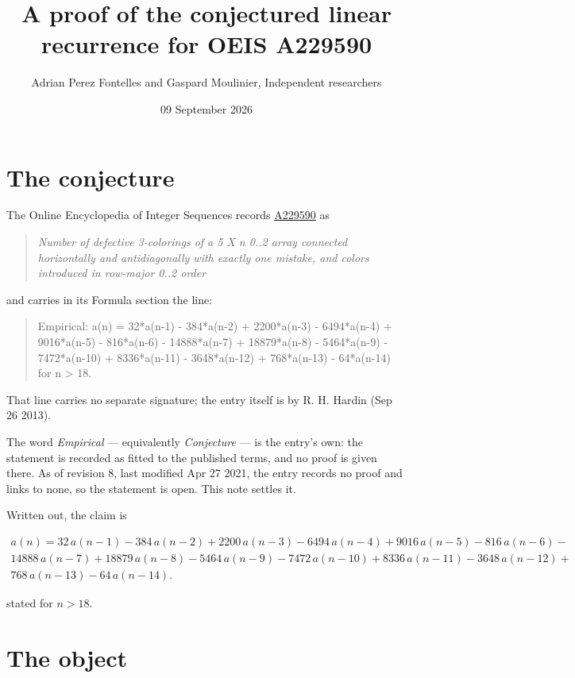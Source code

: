 \documentclass[11pt]{article}
\title{A proof of the conjectured linear recurrence for OEIS A229590}
\author{Adrian Perez Fontelles and Gaspard Moulinier, Independent researchers}
\date{09 September 2026}
\theoremstyle{definition}
\begin{document}
\maketitle
\section{The conjecture}

The Online Encyclopedia of Integer Sequences records \href{https://oeis.org/A229590}{A229590} as

\begin{quote}\itshape Number of defective 3-colorings of a 5 X n 0..2 array connected horizontally and antidiagonally with exactly one mistake, and colors introduced in row-major 0..2 order\end{quote}

and carries in its Formula section the line:

\begin{quote}\ttfamily Empirical: a(n) = 32*a(n-1) - 384*a(n-2) + 2200*a(n-3) - 6494*a(n-4) + 9016*a(n-5) - 816*a(n-6) - 14888*a(n-7) + 18879*a(n-8) - 5464*a(n-9) - 7472*a(n-10) + 8336*a(n-11) - 3648*a(n-12) + 768*a(n-13) - 64*a(n-14) for n > 18.\end{quote}

That line carries no separate signature; the entry itself is by R. H. Hardin (Sep 26 2013).

The word {\itshape Empirical} --- equivalently {\itshape Conjecture} --- is the entry's own: the statement is recorded as fitted to the published terms, and no proof is given there. As of revision 8, last modified Apr 27 2021, the entry records no proof and links to none, so the statement is open. This note settles it.

Written out, the claim is

\begin{multline*} a(n) = 32\,a(n-1) - 384\,a(n-2) + 2200\,a(n-3) - 6494\,a(n-4) + 9016\,a(n-5) - 816\,a(n-6) - \\ 14888\,a(n-7) + 18879\,a(n-8) - 5464\,a(n-9) - 7472\,a(n-10) + 8336\,a(n-11) - 3648\,a(n-12) + \\ 768\,a(n-13) - 64\,a(n-14). \end{multline*}

stated for $n > 18$.

\section{The object}
\end{document}
